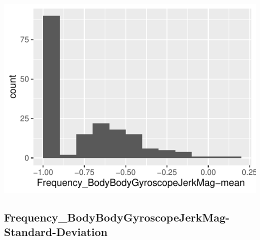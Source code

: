 \documentclass[
]{article}
\begin{document}
\begin{minipage}{0.25 \textwidth}

\includegraphics{codebook_tidydatasub_files/figure-latex/Var-79-Frequency-BodyBodyGyroscopeJerkMag-mean--1.pdf}

\end{minipage}

\noindent\makebox[\linewidth]{\rule{\textwidth}{0.4pt}}

\hypertarget{frequency_bodybodygyroscopejerkmag-standard-deviation}{%
\subsection{Frequency\_BodyBodyGyroscopeJerkMag-Standard-Deviation}\label{frequency_bodybodygyroscopejerkmag-standard-deviation}}
\end{document}

